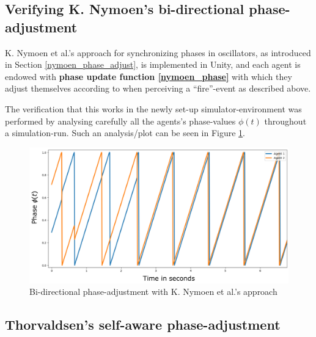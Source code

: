 	
	
	
	\subsection{Verifying K. Nymoen's bi-directional phase-adjustment} %
	
	K. Nymoen et al.'s approach for synchronizing phases in oscillators, as introduced in Section \ref{nymoen_phase_adjust}, is implemented in Unity, and each agent is endowed with \textbf{phase update function \eqref{nymoen_phase}} with which they adjust themselves according to when perceiving a ``fire''-event as described above.
	
	The verification that this works in the newly set-up simulator-environment was performed by analysing carefully all the agents's phase-values $\phi(t)$ throughout a simulation-run. Such an analysis/plot can be seen in Figure \ref{fig:nymoen_phase}.
	
	\begin{figure}[h]
		\centering
		\includegraphics[width=0.9\linewidth]{Assets/Figures/KNymoenPhaseAdjustmentSecondTry.pdf}
		\caption[Illustration of K. Nymoen's bi-directional phase-adjustment]{Bi-directional phase-adjustment with K. Nymoen et al.'s approach}
		\label{fig:nymoen_phase}
	\end{figure}
	
	
	

	\subsection{Thorvaldsen's self-aware phase-adjustment}
	
